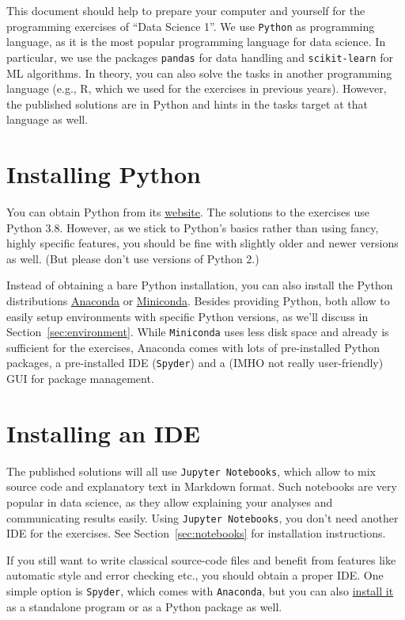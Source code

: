 \documentclass[12pt]{article}
\newcommand{\code}[1]{\textcolor{kitgreen}{\texttt{#1}}}
\begin{document}
\noindent
This document should help to prepare your computer and yourself for the programming exercises of ``Data Science 1''.
We use \code{Python} as programming language, as it is the most popular programming language for data science.
In particular, we use the packages \code{pandas} for data handling and \code{scikit-learn} for ML algorithms.
In theory, you can also solve the tasks in another programming language (e.g., R, which we used for the exercises in previous years).
However, the published solutions are in Python and hints in the tasks target at that language as well.

\section{Installing Python}

You can obtain Python from its \href{https://www.python.org/downloads/}{website}.
The solutions to the exercises use Python 3.8.
However, as we stick to Python's basics rather than using fancy, highly specific features, you should be fine with slightly older and newer versions as well.
(But please don't use versions of Python 2.)

Instead of obtaining a bare Python installation, you can also install the Python distributions \href{https://www.anaconda.com/products/individual}{Anaconda} or \href{https://docs.conda.io/en/latest/miniconda.html}{Miniconda}.
Besides providing Python, both allow to easily setup environments with specific Python versions, as we'll discuss in Section~\ref{sec:environment}.
While \code{Miniconda} uses less disk space and already is sufficient for the exercises, Anaconda comes with lots of pre-installed Python packages, a pre-installed IDE (\code{Spyder}) and a (IMHO not really user-friendly) GUI for package management.

\section{Installing an IDE}

The published solutions will all use \code{Jupyter Notebooks}, which allow to mix source code and explanatory text in Markdown format.
Such notebooks are very popular in data science, as they allow explaining your analyses and communicating results easily.
Using \code{Jupyter Notebooks}, you don't need another IDE for the exercises.
See Section~\ref{sec:notebooks} for installation instructions.

If you still want to write classical source-code files and benefit from features like automatic style and error checking etc., you should obtain a proper IDE.
One simple option is \code{Spyder}, which comes with \code{Anaconda}, but you can also \href{https://docs.spyder-ide.org/current/installation.html}{install it} as a standalone program or as a Python package as well.
\end{document}
